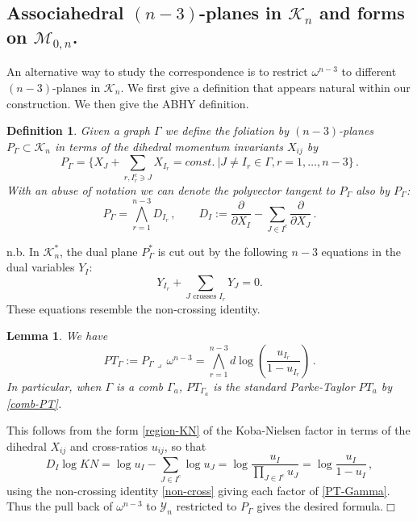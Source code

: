 \documentclass[11pt]{article}
\newcommand{\p}{\partial}
\newcommand{\cK}{\mathcal{K}}
\newcommand{\cM}{\mathcal{M}}
\newcommand{\cY}{\mathcal{Y}}
\newcommand{\1}{{\rm 1\hskip-0.25em I}}
\newcommand{\proof}{ \noindent {\bf Proof:} }
\newtheorem{defn}{Definition}[section]
\newtheorem{lemma}{Lemma}[section]
\begin{document}
\subsection{Associahedral $(n-3)$-planes in $\cK_n$ and forms on $\cM_{0,n}$.}

An alternative way to study the correspondence is to restrict $\omega^{n-3}$ to different $(n-3)$-planes in $\cK_n$. We first give a definition that appears natural within our construction.  We then give the ABHY definition.

\begin{defn}
Given a graph $\Gamma$ we define the foliation by $(n-3)$-planes $P_\Gamma\subset \cK_n$  in terms of the dihedral  momentum invariants $X_{ij}$ by 
\begin{equation}
P_\Gamma=\{ X_J + \sum_{r, I_r^c\ni J} X_{I_r}=const.\ | J\neq  I_r\in \Gamma, r=1,\ldots , n-3\}\,. \label{P-def}
\end{equation}
With an abuse of notation we can denote the polyvector tangent to $P_\Gamma$ also by $P_\Gamma$:
\begin{equation}
P_\Gamma=\bigwedge_{r=1}^{n-3}D_{I_r} \, , \qquad D_{I}:=\frac{\p}{\p X_{I}}-\sum _{J\in I^c}\frac{\p}{\p X_{J}}\, .
\end{equation}
\end{defn}

n.b. In $\cK_n^*$, the dual plane $P_\Gamma^*$ is cut out by the following $n-3$ equations in the dual variables $Y_I$:
$$
Y_{I_r} + \sum_{J\text{ crosses } I_r} Y_J = 0.
$$
These equations resemble the non-crossing identity. 

\begin{lemma} We have
\begin{equation}
PT_\Gamma:=P_\Gamma\lrcorner \, \omega^{n-3}=\bigwedge_{r=1}^{n-3} d\log \left(\frac{u_{I_r}}{1-u_{I_r}}\right)\, .\label{PT-Gamma}
\end{equation}
In particular, when $\Gamma$ is a comb $\Gamma_a$, $PT_{\Gamma_a}$ is the standard Parke-Taylor $PT_a$ by \eqref{comb-PT}.
\end{lemma}

\proof
This follows from the form \eqref{region-KN} of the Koba-Nielsen factor in terms of the dihedral  $X_{ij}$ and cross-ratios $u_{ij}$, so that
\begin{equation}
D_I \log  KN= \log u_I -\sum_{J\in I^c} \log u_J= \log \frac{u_I}{\prod_{J\in I^c} u_J}=\log \frac{u_I}{1-u_I}\, ,
\end{equation}
using the non-crossing identity \eqref{non-cross} giving each factor of \eqref{PT-Gamma}.
Thus  the pull back of $\omega^{n-3}$ to $\cY_n$ restricted to $P_\Gamma$ gives the desired formula.$\Box$
\end{document}
